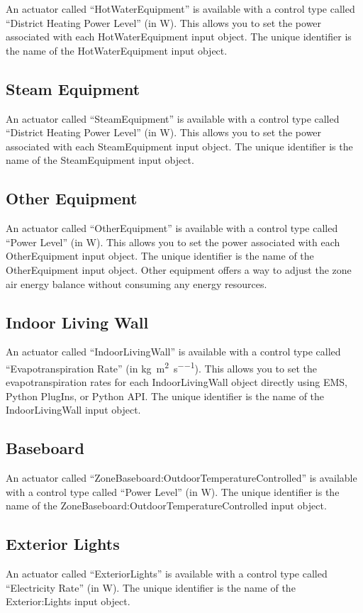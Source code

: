 An actuator called ``HotWaterEquipment'' is available with a control type called ``District Heating Power Level'' (in W). This allows you to set the power associated with each HotWaterEquipment input object. The unique identifier is the name of the HotWaterEquipment input object.

\subsection{Steam Equipment}\label{steam-equipment}

An actuator called ``SteamEquipment'' is available with a control type called ``District Heating Power Level'' (in W). This allows you to set the power associated with each SteamEquipment input object. The unique identifier is the name of the SteamEquipment input object.

\subsection{Other Equipment}\label{other-equipment}

An actuator called ``OtherEquipment'' is available with a control type called ``Power Level'' (in W). This allows you to set the power associated with each OtherEquipment input object. The unique identifier is the name of the OtherEquipment input object.  Other equipment offers a way to adjust the zone air energy balance without consuming any energy resources.

\subsection{Indoor Living Wall}\label{indoor-living-wall}

An actuator called ``IndoorLivingWall'' is available with a control type called ``Evapotranspiration Rate'' (in \unit{\kilo\gram\per\square\meter\per\second}). This allows you to set the evapotranspiration rates for each IndoorLivingWall object directly using EMS, Python PlugIns, or Python API. The unique identifier is the name of the IndoorLivingWall input object.

\subsection{Baseboard}\label{baseboard}

An actuator called ``ZoneBaseboard:OutdoorTemperatureControlled'' is available with a control type called ``Power Level'' (in W). The unique identifier is the name of the ZoneBaseboard:OutdoorTemperatureControlled input object.

\subsection{Exterior Lights}\label{exterior-lights}

An actuator called ``ExteriorLights'' is available with a control type called ``Electricity Rate'' (in W). The unique identifier is the name of the Exterior:Lights input object.
